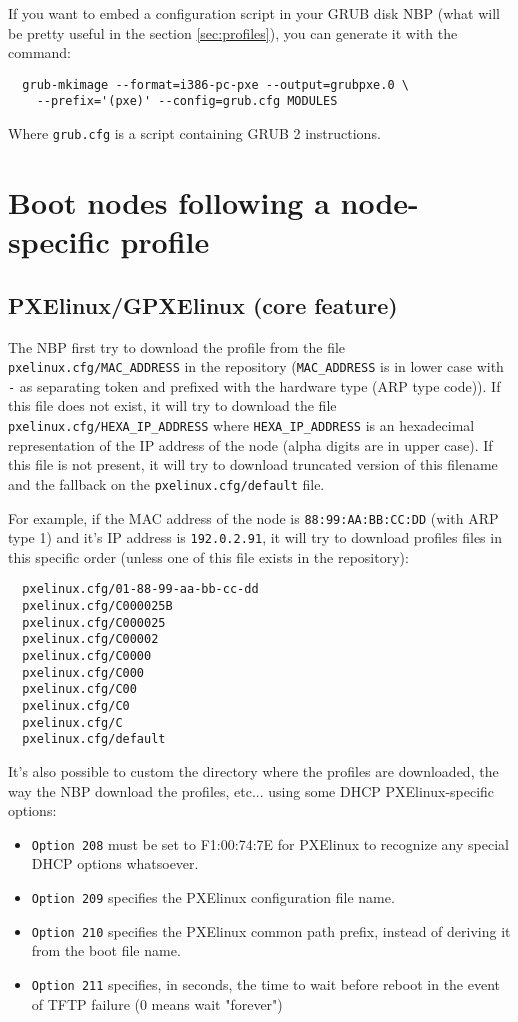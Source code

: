 \documentclass[a4paper,11pt]{article}
\begin{document}
If you want to embed a configuration script in your GRUB disk NBP (what will be pretty useful in the section \ref{sec:profiles}), you can generate it with the command:
\begin{verbatim}
  grub-mkimage --format=i386-pc-pxe --output=grubpxe.0 \
    --prefix='(pxe)' --config=grub.cfg MODULES
\end{verbatim}
Where \texttt{grub.cfg} is a script containing GRUB 2 instructions.


\section{Boot nodes following a node-specific profile\label{sec:profiles}}
\subsection{PXElinux/GPXElinux (core feature)}

The NBP first try to download the profile from the file \texttt{pxelinux.cfg/MAC\_ADDRESS} in the repository (\texttt{MAC\_ADDRESS} is in lower case with \texttt{-} as separating token and prefixed with the hardware type (ARP type code)). If this file does not exist, it will try to download the file \texttt{pxelinux.cfg/HEXA\_IP\_ADDRESS} where \texttt{HEXA\_IP\_ADDRESS} is an hexadecimal representation of the IP address of the node (alpha digits are in upper case). If this file is not present, it will try to download truncated version of this filename and the fallback on the \texttt{pxelinux.cfg/default} file.

For example, if the MAC address of the node is \texttt{88:99:AA:BB:CC:DD} (with ARP type 1) and it's IP address is \texttt{192.0.2.91}, it will try to download profiles files in this specific order (unless one of this file exists in the repository):
\begin{verbatim}
  pxelinux.cfg/01-88-99-aa-bb-cc-dd
  pxelinux.cfg/C000025B
  pxelinux.cfg/C000025
  pxelinux.cfg/C00002
  pxelinux.cfg/C0000
  pxelinux.cfg/C000
  pxelinux.cfg/C00
  pxelinux.cfg/C0
  pxelinux.cfg/C
  pxelinux.cfg/default
\end{verbatim}

It's also possible to custom the directory where the profiles are downloaded, the way the NBP download the profiles, etc... using some DHCP PXElinux-specific options:
\begin{itemize}
\item \texttt{Option 208} must be set to F1:00:74:7E for PXElinux to recognize any special DHCP options whatsoever.
\item \texttt{Option 209} specifies the PXElinux configuration file name.
\item \texttt{Option 210} specifies the PXElinux common path prefix, instead of deriving it from the boot file name.
\item \texttt{Option 211} specifies, in seconds, the time to wait before reboot in the event of TFTP failure (0 means wait "forever")
\end{itemize}
\end{document}
